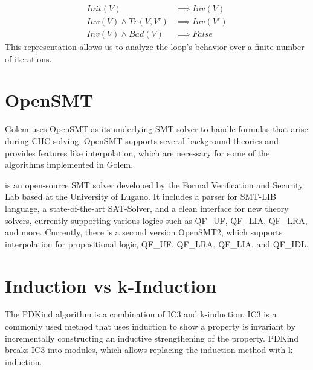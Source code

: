 \vspace{\baselineskip}
\begin{equation}
    \begin{aligned}
        Init(V) &\implies Inv(V) \\
        Inv(V) \land Tr(V, V') &\implies Inv(V') \\
        Inv(V) \land Bad(V) &\implies False
    \end{aligned}
\end{equation}
This representation allows us to analyze the loop's behavior over a finite number of iterations. 


\section{OpenSMT}
\noindent Golem uses OpenSMT\cite{10.1007/978-3-642-12002-2_12} as its underlying SMT solver to handle formulas that arise during CHC solving. OpenSMT supports several background theories and provides features like interpolation, which are necessary for some of the algorithms implemented in Golem. 

is an open-source SMT solver developed by the Formal Verification and Security Lab based at the University of Lugano. It includes a parser for SMT-LIB\cite{BarFT-SMTLIB} language, a state-of-the-art SAT-Solver, and a clean interface for new theory solvers, currently supporting various logics such as QF\_UF, QF\_LIA, QF\_LRA, and more. Currently, there is a second version OpenSMT2\cite{10.1007/978-3-319-40970-2_35}, which supports interpolation for propositional logic, QF\_UF, QF\_LRA, QF\_LIA, and QF\_IDL.

\section{Induction vs k-Induction}
\noindent The PDKind algorithm is a combination of IC3 and k-induction.
IC3\cite{6148908} is a commonly used method that uses induction to show a property is invariant by incrementally constructing an inductive strengthening of the property. PDKind \cite{7886665} breaks IC3 into modules, which allows replacing the induction method with k-induction.

